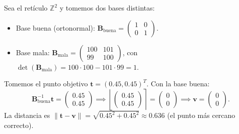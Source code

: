 \documentclass[11pt,a4paper,twoside,openright]{book}
\theoremstyle{plain}
\theoremstyle{definition}
\theoremstyle{remark}
\newcommand{\Z}{\mathbb{Z}}
\newcommand{\vv}[1]{\mathbf{#1}}
\newcommand{\mm}[1]{\mathbf{#1}}
\newcommand{\round}[1]{\left\lfloor #1 \right\rceil}
\begin{document}
\begin{ejemplopaso}
Sea el ret\'iculo $\Z^2$ y tomemos dos bases distintas:
\begin{itemize}
  \item Base buena (ortonormal): $\mm{B}_{\text{buena}} = \begin{pmatrix} 1 & 0 \\ 0 & 1 \end{pmatrix}$.
  \item Base mala: $\mm{B}_{\text{mala}} = \begin{pmatrix} 100 & 101 \\ 99 & 100 \end{pmatrix}$, con $\det(\mm{B}_{\text{mala}}) = 100\cdot 100 - 101\cdot 99 = 1$.
\end{itemize}
Tomemos el punto objetivo $\vv{t} = (0.45, 0.45)^T$.
Con la base buena:
\[
  \mm{B}_{\text{buena}}^{-1} \vv{t} = \begin{pmatrix} 0.45 \\ 0.45 \end{pmatrix} \implies \round{\begin{pmatrix} 0.45 \\ 0.45 \end{pmatrix}} = \begin{pmatrix} 0 \\ 0 \end{pmatrix} \implies \vv{v} = \begin{pmatrix} 0 \\ 0 \end{pmatrix}.
\]
La distancia es $\|\vv{t} - \vv{v}\| = \sqrt{0.45^2 + 0.45^2} \approx 0.636$ (el punto m\'as cercano correcto).


\end{ejemplopaso}
\end{document}

